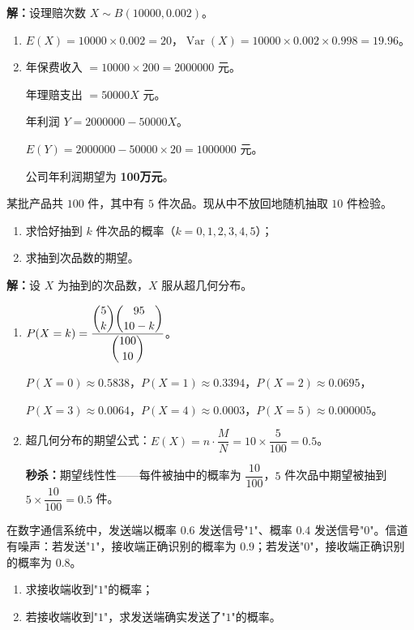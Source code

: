 \documentclass[12pt, a4paper]{ctexart}
\begin{document}
\textbf{解：}\quad 设理赔次数 $X\sim B(10000,0.002)$。
\begin{enumerate}[leftmargin=1.5em]
  \item $E(X)=10000\times0.002=20$，$\operatorname{Var}(X)=10000\times0.002\times0.998=19.96$。
  \item 年保费收入 $=10000\times200=2000000$ 元。\par
  年理赔支出 $=50000X$ 元。\par
  年利润 $Y=2000000-50000X$。\par
  $E(Y)=2000000-50000\times20=1000000$ 元。\par
  公司年利润期望为 \textbf{100万元}。
\end{enumerate}

\begin{appbox}[【应用2】质量检验方案]
某批产品共 $100$ 件，其中有 $5$ 件次品。现从中不放回地随机抽取 $10$ 件检验。
\begin{enumerate}[leftmargin=1.5em]
  \item 求恰好抽到 $k$ 件次品的概率（$k=0,1,2,3,4,5$）；
  \item 求抽到次品数的期望。
\end{enumerate}
\end{appbox}

\textbf{解：}\quad 设 $X$ 为抽到的次品数，$X$ 服从超几何分布。
\begin{enumerate}[leftmargin=1.5em]
  \item $P(X=k)=\dfrac{\dbinom{5}{k}\dbinom{95}{10-k}}{\dbinom{100}{10}}$。\par
  $P(X=0)\approx0.5838$，$P(X=1)\approx0.3394$，$P(X=2)\approx0.0695$，\par
  $P(X=3)\approx0.0064$，$P(X=4)\approx0.0003$，$P(X=5)\approx0.000005$。
  \item 超几何分布的期望公式：$E(X)=n\cdot\dfrac{M}{N}=10\times\dfrac{5}{100}=0.5$。\par
  \textbf{秒杀：}期望线性性——每件被抽中的概率为 $\dfrac{10}{100}$，$5$ 件次品中期望被抽到 $5\times\dfrac{10}{100}=0.5$ 件。
\end{enumerate}

\begin{appbox}[【应用3】信号传输与贝叶斯]
在数字通信系统中，发送端以概率 $0.6$ 发送信号"$1$"、概率 $0.4$ 发送信号"$0$"。信道有噪声：若发送"$1$"，接收端正确识别的概率为 $0.9$；若发送"$0$"，接收端正确识别的概率为 $0.8$。
\begin{enumerate}[leftmargin=1.5em]
  \item 求接收端收到"$1$"的概率；
  \item 若接收端收到"$1$"，求发送端确实发送了"$1$"的概率。
\end{enumerate}
\end{appbox}
\end{document}
